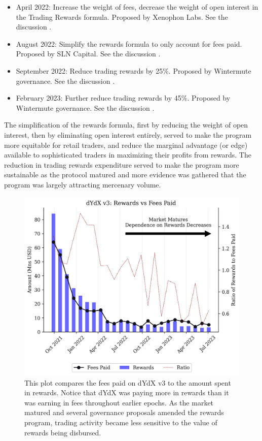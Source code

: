         \begin{itemize}
            \item April 2022: Increase the weight of fees, decrease the weight of open interest in the Trading Rewards formula. Proposed by Xenophon Labs. See the discussion .
            \item August 2022: Simplify the rewards formula to only account for fees paid. Proposed by SLN Capital. See the discussion .
            \item September 2022: Reduce trading rewards by 25\%. Proposed by Wintermute governance. See the discussion .
            \item February 2023: Further reduce trading rewards by 45\%. Proposed by Wintermute governance. See the discussion .
        \end{itemize}

        The simplification of the rewards formula, first by reducing the weight of open interest, then by eliminating open interest entirely, served to make the program more equitable for retail traders, and reduce the marginal advantage (or edge) available to sophisticated traders in maximizing their profits from rewards. The reduction in trading rewards expenditure served to make the program more sustainable as the protocol matured and more evidence was gathered that the program was largely attracting mercenary volume. 

        \begin{figure}[htp]
            \centering
            \includegraphics[width=0.7\linewidth]{figs/v3_rewards_analysis.png}
            \caption{This plot compares the fees paid on dYdX v3 to the amount spent in rewards. Notice that dYdX was paying more in rewards than it was earning in fees throughout earlier epochs. As the market matured and several governance proposals amended the rewards program, trading activity became less sensitive to the value of rewards being disbursed.}
            \label{fig:v3_rewards_analysis}
        \end{figure}


